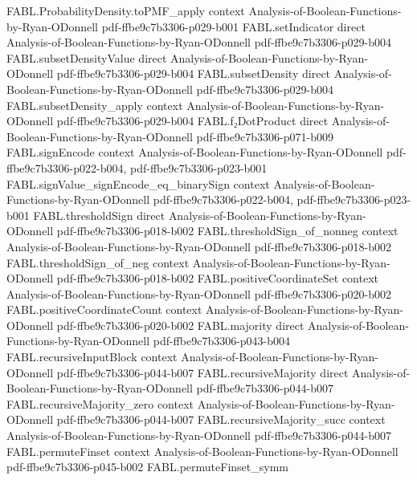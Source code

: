 \begin{theorem}
  {FABL.ProbabilityDensity.toPMF_apply}
  {context}
  {Analysis-of-Boolean-Functions-by-Ryan-ODonnell}
  {pdf-ffbe9c7b3306-p029-b001}
\proofstep
  {FABL.setIndicator}
  {direct}
  {Analysis-of-Boolean-Functions-by-Ryan-ODonnell}
  {pdf-ffbe9c7b3306-p029-b004}
\proofstep
  {FABL.subsetDensityValue}
  {direct}
  {Analysis-of-Boolean-Functions-by-Ryan-ODonnell}
  {pdf-ffbe9c7b3306-p029-b004}
\proofstep
  {FABL.subsetDensity}
  {direct}
  {Analysis-of-Boolean-Functions-by-Ryan-ODonnell}
  {pdf-ffbe9c7b3306-p029-b004}
\proofstep
  {FABL.subsetDensity_apply}
  {context}
  {Analysis-of-Boolean-Functions-by-Ryan-ODonnell}
  {pdf-ffbe9c7b3306-p029-b004}
\proofstep
  {FABL.f₂DotProduct}
  {direct}
  {Analysis-of-Boolean-Functions-by-Ryan-ODonnell}
  {pdf-ffbe9c7b3306-p071-b009}
\proofstep
  {FABL.signEncode}
  {context}
  {Analysis-of-Boolean-Functions-by-Ryan-ODonnell}
  {pdf-ffbe9c7b3306-p022-b004,
    pdf-ffbe9c7b3306-p023-b001}
\proofstep
  {FABL.signValue_signEncode_eq_binarySign}
  {context}
  {Analysis-of-Boolean-Functions-by-Ryan-ODonnell}
  {pdf-ffbe9c7b3306-p022-b004,
    pdf-ffbe9c7b3306-p023-b001}
\proofstep
  {FABL.thresholdSign}
  {direct}
  {Analysis-of-Boolean-Functions-by-Ryan-ODonnell}
  {pdf-ffbe9c7b3306-p018-b002}
\proofstep
  {FABL.thresholdSign_of_nonneg}
  {context}
  {Analysis-of-Boolean-Functions-by-Ryan-ODonnell}
  {pdf-ffbe9c7b3306-p018-b002}
\proofstep
  {FABL.thresholdSign_of_neg}
  {context}
  {Analysis-of-Boolean-Functions-by-Ryan-ODonnell}
  {pdf-ffbe9c7b3306-p018-b002}
\proofstep
  {FABL.positiveCoordinateSet}
  {context}
  {Analysis-of-Boolean-Functions-by-Ryan-ODonnell}
  {pdf-ffbe9c7b3306-p020-b002}
\proofstep
  {FABL.positiveCoordinateCount}
  {context}
  {Analysis-of-Boolean-Functions-by-Ryan-ODonnell}
  {pdf-ffbe9c7b3306-p020-b002}
\proofstep
  {FABL.majority}
  {direct}
  {Analysis-of-Boolean-Functions-by-Ryan-ODonnell}
  {pdf-ffbe9c7b3306-p043-b004}
\proofstep
  {FABL.recursiveInputBlock}
  {context}
  {Analysis-of-Boolean-Functions-by-Ryan-ODonnell}
  {pdf-ffbe9c7b3306-p044-b007}
\proofstep
  {FABL.recursiveMajority}
  {direct}
  {Analysis-of-Boolean-Functions-by-Ryan-ODonnell}
  {pdf-ffbe9c7b3306-p044-b007}
\proofstep
  {FABL.recursiveMajority_zero}
  {context}
  {Analysis-of-Boolean-Functions-by-Ryan-ODonnell}
  {pdf-ffbe9c7b3306-p044-b007}
\proofstep
  {FABL.recursiveMajority_succ}
  {context}
  {Analysis-of-Boolean-Functions-by-Ryan-ODonnell}
  {pdf-ffbe9c7b3306-p044-b007}
\proofstep
  {FABL.permuteFinset}
  {context}
  {Analysis-of-Boolean-Functions-by-Ryan-ODonnell}
  {pdf-ffbe9c7b3306-p045-b002}
\proofstep
  {FABL.permuteFinset_symm}

\end{theorem}
